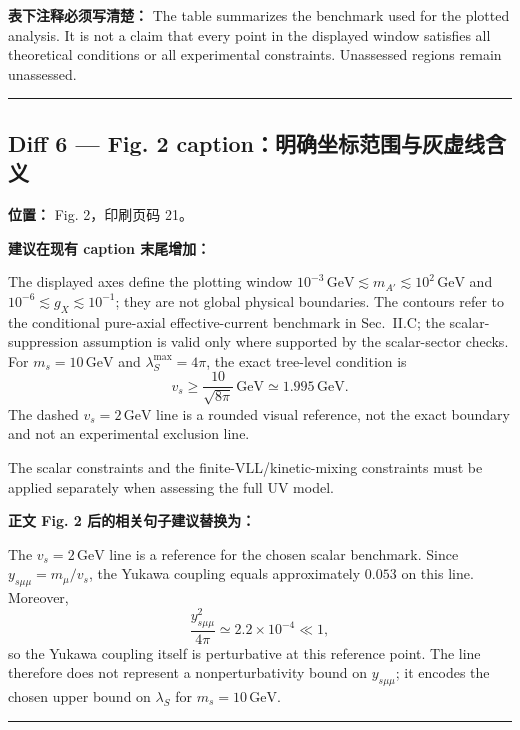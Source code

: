 \documentclass[
]{article}
\begin{document}
\textbf{表下注释必须写清楚：} The table summarizes the benchmark used
for the plotted analysis. It is not a claim that every point in the
displayed window satisfies all theoretical conditions or all
experimental constraints. Unassessed regions remain unassessed.

\begin{center}\rule{0.5\linewidth}{0.5pt}\end{center}

\subsection{Diff 6 --- Fig. 2
caption：明确坐标范围与灰虚线含义}\label{diff-6-fig.-2-captionux660eux786eux5750ux6807ux8303ux56f4ux4e0eux7070ux865aux7ebfux542bux4e49}

\textbf{位置：} Fig. 2，印刷页码 21。

\textbf{建议在现有 caption 末尾增加：}

The displayed axes define the plotting window
\(10^{-3}\,\mathrm{GeV}\lesssim m_{A'}\lesssim 10^2\,\mathrm{GeV}\) and
\(10^{-6}\lesssim g_X\lesssim 10^{-1}\); they are not global physical
boundaries. The contours refer to the conditional pure-axial
effective-current benchmark in Sec.~II.C; the scalar-suppression
assumption is valid only where supported by the scalar-sector checks.
For \(m_s=10\,\mathrm{GeV}\) and \(\lambda_S^{\max}=4\pi\), the exact
tree-level condition is
\[
v_s\geq \frac{10}{\sqrt{8\pi}}\,\mathrm{GeV}
\simeq 1.995\,\mathrm{GeV}.
\]
The dashed \(v_s=2\,\mathrm{GeV}\) line is a rounded visual reference,
not the exact boundary and not an experimental exclusion line.

The scalar constraints and the finite-VLL/kinetic-mixing constraints
must be applied separately when assessing the full UV model.

\textbf{正文 Fig. 2 后的相关句子建议替换为：}

The \(v_s=2\,\mathrm{GeV}\) line is a reference for the chosen scalar
benchmark. Since \(y_{s\mu\mu}=m_\mu/v_s\), the Yukawa coupling equals
approximately \(0.053\) on this line. Moreover,
\[
\frac{y_{s\mu\mu}^2}{4\pi}
\simeq 2.2\times 10^{-4}\ll 1,
\]
so the Yukawa coupling itself is perturbative at this reference point.
The line therefore does not represent a nonperturbativity bound on
\(y_{s\mu\mu}\); it encodes the chosen upper bound on
\(\lambda_S\) for \(m_s=10\,\mathrm{GeV}\).

\begin{center}\rule{0.5\linewidth}{0.5pt}\end{center}
\end{document}
